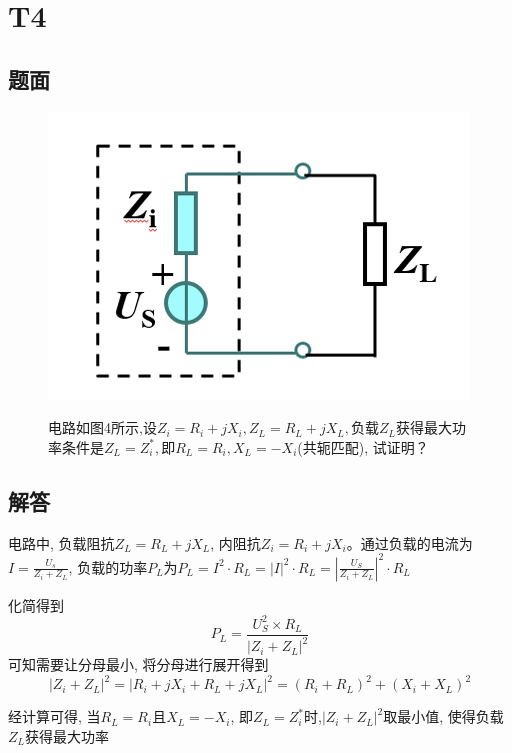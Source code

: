 \documentclass[10pt, a4paper]{article} %
\begin{document}
\clearpage

\section{T4}
\subsection{题面}
\begin{figure}[htbp] %
    \centering
    \begin{minipage}[t]{0.40\textwidth} %
        \centering
        \includegraphics[width=\linewidth]{image/T4.png} %
        \caption{}
        \label{fig:side:d}
    \end{minipage}
    \hfill %
    \begin{minipage}[t]{0.66\textwidth} 
        电路如图4所示,设$Z_{i} = R_{i} + jX_{i}, Z_{L} = R_{L} + jX_{L},$负载$Z_{L}$获得最大功率条件是$Z_{L} = Z_{i}^{*},$即$R_{L} = R_{i}, X_{L} = -X_{i}$(共轭匹配), 试证明？

    \end{minipage}
\end{figure}


\subsection{解答}
电路中, 负载阻抗$Z_{L} = R_{L}+jX_{L}$, 内阻抗$Z_{i} = R_{i} + jX_{i}$。通过负载的电流为 $I = \frac{U_{s}}{Z_{i} + Z_{L}}$, 负载的功率\(P_{L}\)为$P_{L} = I^2\cdot R_{L} = \left\lvert I\right\rvert^2\cdot R_{L} = \left\lvert \frac{U_{S}}{Z_{i} + Z_{L}}\right\rvert^2 \cdot R_{L}  $

化简得到$$P_{L} = \frac{U_{S}^2\times R_{L}}{\left\lvert Z_{i} + Z_{L}\right\rvert^2 }$$可知需要让分母最小, 将分母进行展开得到$$\left\lvert Z_{i} + Z_{L}\right\rvert^2 = \left\lvert R_{i} + jX_{i} + R_{L} + jX_{L}\right\rvert^2 = (R_{i}+R_{L})^2 + (X_{i} + X_{L})^2 $$

经计算可得, 当$R_{L} = R_{i}$且$X_{L} = -X_{i}$, 即$Z_{L} = Z_{i}^*$时,$\left\lvert Z_{i} + Z_{L}\right\rvert^2 $取最小值, 使得负载$Z_{L}$获得最大功率
\end{document}
